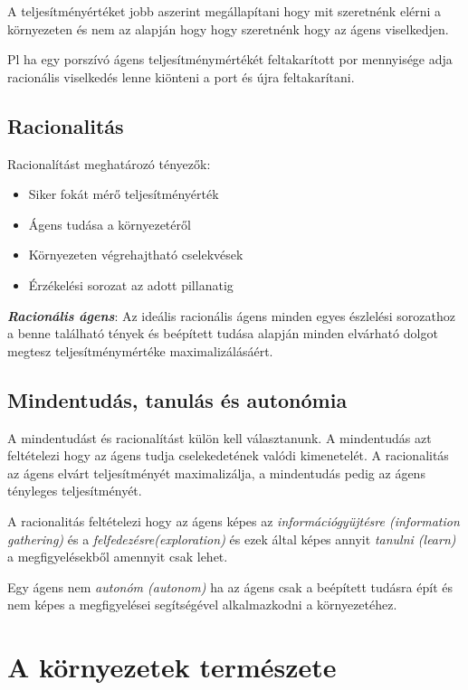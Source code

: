 \documentclass[a4paper,10pt]{scrbook}
\begin{document}
A teljesítményértéket jobb aszerint megállapítani hogy mit szeretnénk elérni a környezeten és nem 
az alapján hogy hogy szeretnénk hogy az ágens viselkedjen. 

\bigskip
\noindent
Pl ha egy porszívó ágens teljesítménymértékét feltakarított por mennyisége adja racionális viselkedés
lenne kiönteni a port és újra feltakarítani. 

\subsection{Racionalitás}

Racionalítást meghatározó tényezők:

\begin{itemize}
\item{Siker fokát mérő teljesítményérték}
\item{Ágens tudása a környezetéről}
\item{Környezeten végrehajtható cselekvések}
\item{Érzékelési sorozat az adott pillanatig} 
\end{itemize}

\bigskip
\noindent
\textbf{\emph{Racionális ágens}}: 
Az ideális racionális ágens minden egyes észlelési sorozathoz a benne található tények és 
beépített tudása alapján minden elvárható dolgot megtesz teljesítménymértéke maximalizálásáért. 

\subsection{Mindentudás, tanulás és autonómia}

A mindentudást és racionalítást külön kell választanunk. A mindentudás azt feltételezi hogy az 
ágens tudja cselekedetének valódi kimenetelét. A racionalitás az ágens elvárt teljesítményét 
maximalizálja, a mindentudás pedig az ágens tényleges teljesítményét. 

\bigskip
\noindent
A racionalitás feltételezi hogy az ágens képes az \emph{információgyüjtésre (information gathering)} 
és a \emph{felfedezésre(exploration)} és ezek által képes annyit \emph{tanulni (learn)} a megfigyelésekből 
amennyit csak lehet. 

\bigskip
\noindent
Egy ágens nem \emph{autonóm (autonom)} ha az ágens csak a beépített tudásra  épít és nem képes a 
megfigyelései segítségével alkalmazkodni a környezetéhez. 

\section{A környezetek természete}
\end{document}
